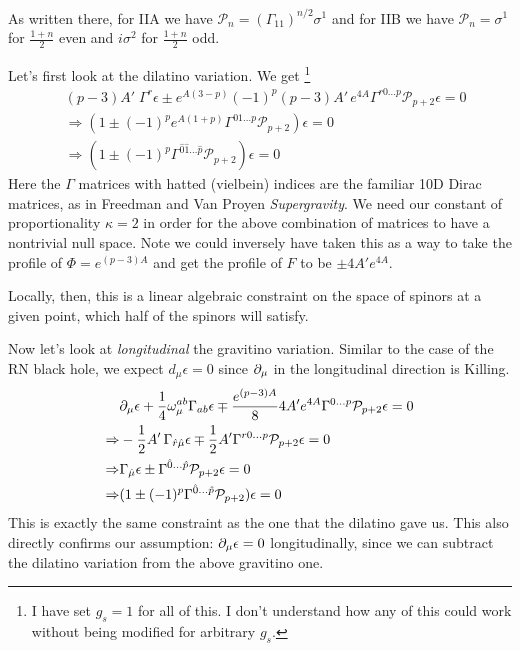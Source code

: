 \documentclass[11pt, class=article, crop=false]{standalone}
\begin{document}
\begin{enumerate}
	 As written there, for IIA we have $\mathcal P_n = (\Gamma_{11})^{n/2} \sigma^1$ and for IIB we have $\mathcal P_n = \sigma^1$ for $\frac{1+n}{2}$ even and $i \sigma^2$ for $\frac{1+n}{2}$ odd. 
	
	Let's first look at the dilatino variation. We get \footnote{I have set $g_s = 1$ for all of this. I don't understand how any of this could work without being modified for arbitrary $g_s$.}
	\[
	\begin{aligned}
		&(p-3) A' \; \Gamma^r \epsilon \pm e^{A(3-p)} (-1)^{p} (p-3) A'\, e^{4A} \Gamma^{r 0 \dots p} \mathcal P_{p+2} \epsilon = 0\\
		& \Rightarrow (1 \pm (-1)^{p} e^{A (1 + p)} \Gamma^{0 1 \dots p} \mathcal P_{p+2}) \epsilon = 0\\
		& \Rightarrow (1 \pm  (-1)^{p} \Gamma^{\hat 0 \hat 1 \dots \hat p} \mathcal P_{p+2}) \epsilon = 0
	\end{aligned}
	\]
	Here the $\Gamma$ matrices with hatted (vielbein) indices are the familiar 10D Dirac matrices, as in Freedman and Van Proyen \emph{Supergravity}. We need our constant of proportionality $\kappa=2$ in order for the above combination of matrices to have a nontrivial null space. Note we could inversely have taken this as a way to take the profile of $\Phi = e^{(p-3) A}$ and get the profile of $F$ to be  $\pm 4 A' e^{4A}$.

	Locally, then, this is a linear algebraic constraint on the space of spinors at a given point, which half of the spinors will satisfy. 
	
	Now let's look at \emph{longitudinal} the gravitino variation. Similar to the case of the RN black hole, we expect $d_\mu \epsilon = 0$ since $\partial_\mu$ in the longitudinal direction is Killing.
	\[
	\begin{aligned}
		& \partial_\mu \epsilon + \frac14 \omega_\mu^{ab} \Gamma_{ab} \epsilon \mp \frac{e^{(p-3)A}}{8} 4 A' e^{4 A} \Gamma^{0 \dots p} \mathcal P_{p+2} \epsilon = 0 \\
		\Rightarrow & - \frac12 A' \, \Gamma_{\hat r \hat \mu} \epsilon \mp \frac12 A' \Gamma^{r 0 \dots p} \mathcal P_{p+2} \epsilon = 0\\
		\Rightarrow & \Gamma_{\hat \mu} \epsilon \pm \Gamma^{\hat 0 \dots \hat p} \mathcal P_{p+2} \epsilon = 0\\
		\Rightarrow & (1 \pm (-1)^p \Gamma^{\hat 0 \dots \hat p} \mathcal P_{p+2}) \epsilon = 0
	\end{aligned}
	\]
	This is exactly the same constraint as the one that the dilatino gave us. This also directly confirms our assumption: $\partial_\mu \epsilon = 0$ longitudinally, since we can subtract the dilatino variation from the above gravitino one. 
	

\end{enumerate}
\end{document}
